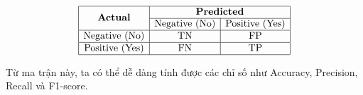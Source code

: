 \[
\begin{array}{|c|c|c|}
\hline
\multirow{2}{*}{\textbf{Actual}} & \multicolumn{2}{c|}{\textbf{Predicted}} \\
\cline{2-3}
& \text{Negative (No)} & \text{Positive (Yes)} \\
\hline
\text{Negative (No)} & \text{TN} & \text{FP} \\
\hline
\text{Positive (Yes)} & \text{FN} & \text{TP} \\
\hline
\end{array}
\]


Từ ma trận này, ta có thể dễ dàng tính được các chỉ số như Accuracy, Precision, Recall và F1-score.

\pagebreak